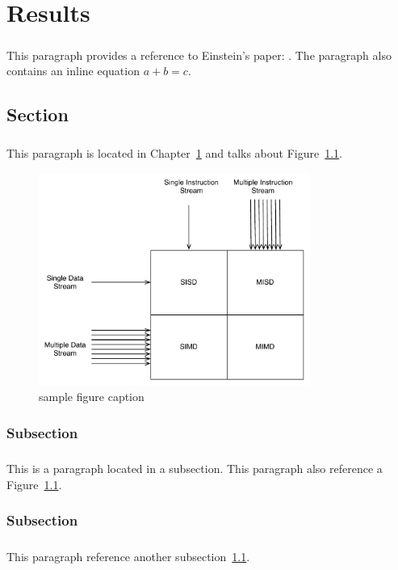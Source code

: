 \chapter{Results}
\label{chap:chapter1}

\paragraph{}This paragraph provides a reference to Einstein's paper: \cite{Einstein}. The paragraph also contains an inline equation $a+b=c$.

\section{Section}
\label{sec:section1}

\paragraph{}This paragraph is located in Chapter~\ref{chap:chapter1} and talks about Figure~\ref{fig:sampleFigureLabel}.

\begin{figure}[h]
\centering
\includegraphics[width=3.5in]{./Figures/sampleFigureFlynn.pdf}
\caption{sample figure caption}
\label{fig:sampleFigureLabel}
\end{figure}

\subsection{Subsection} 
\label{ssec:subsection1}


\paragraph{}This is a paragraph located in a subsection.  This paragraph also reference a  Figure~\ref{fig:sampleFigureLabel}.


\subsection{Subsection}
\label{ssec:subsection2}

\paragraph{}This paragraph reference another subsection~\ref{sec:section1}.